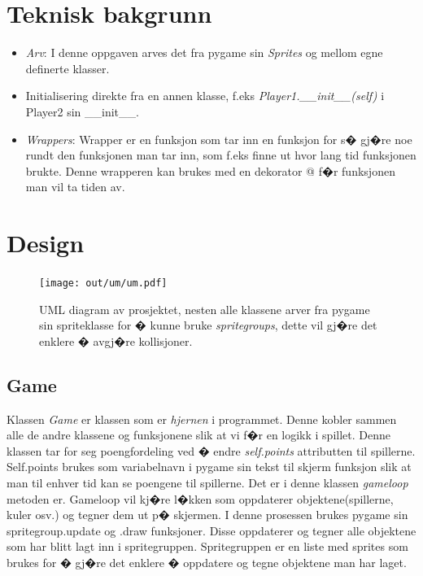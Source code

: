 {\section{Teknisk bakgrunn}

\begin{itemize}
    \item \emph{Arv}: I denne oppgaven arves det fra pygame sin \emph{Sprites} og mellom egne definerte klasser.
    \item Initialisering direkte fra en annen klasse, f.eks \emph{Player1.\_\_init\_\_(self)} i Player2 sin \_\_init\_\_.
    \item \emph{Wrappers}: Wrapper er en funksjon som tar inn en funksjon for s� gj�re noe rundt den funksjonen man tar inn, som f.eks finne ut hvor lang tid funksjonen brukte. Denne wrapperen kan brukes med en dekorator @ f�r funksjonen man vil ta tiden av.
\end{itemize}


\section{Design}



\begin{figure}[hbt!]
{\centering
    \texttt{[image: out/um/um.pdf]}
    \caption{UML diagram av prosjektet, nesten alle klassene arver fra pygame sin spriteklasse for � kunne bruke \emph{spritegroups}, dette vil gj�re det enklere � avgj�re kollisjoner.}
    \label{UML}
\par}
\end{figure}


\subsection{Game}
Klassen \emph{Game} er klassen som er \emph{hjernen} i programmet. Denne kobler sammen alle de andre klassene og funksjonene slik at vi f�r en logikk i spillet. Denne klassen  tar for seg poengfordeling ved � endre \emph{self.points} attributten til spillerne. Self.points brukes som variabelnavn i pygame sin tekst til skjerm funksjon slik at man til enhver tid kan se poengene til spillerne. Det er i denne klassen \emph{gameloop} metoden er. Gameloop vil kj�re l�kken som oppdaterer objektene(spillerne, kuler osv.) og tegner dem ut p� skjermen. I denne prosessen brukes pygame sin spritegroup.update og .draw funksjoner. Disse oppdaterer og tegner alle objektene som har blitt lagt inn i spritegruppen. Spritegruppen er en liste med sprites som brukes for � gj�re det enklere � oppdatere og tegne objektene man har laget. 

}
